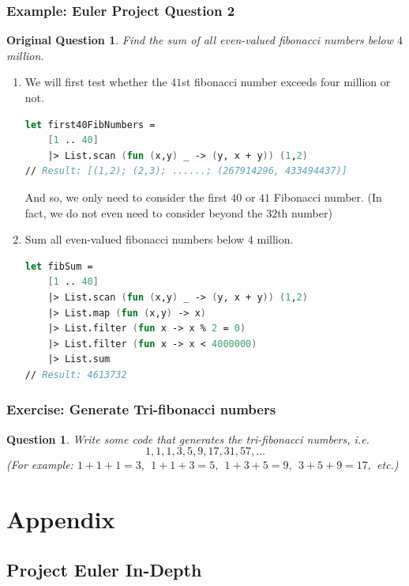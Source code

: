 \documentclass[12pt]{article}
\newtheorem*{question*}{Question}
\newtheorem*{origQuestion*}{Original Question}
\begin{document}
\subsubsection*{Example: Euler Project Question 2}
\begin{origQuestion*}
Find the sum of all even-valued fibonacci numbers below $4$ million.
\end{origQuestion*}
\begin{enumerate}
\item We will first test whether the $41$st fibonacci number exceeds four million or not.
\begin{lstlisting}[language=FSharp]
let first40FibNumbers =
    [1 .. 40]
    |> List.scan (fun (x,y) _ -> (y, x + y)) (1,2)
// Result: [(1,2); (2,3); ......; (267914296, 433494437)]
\end{lstlisting}
And so, we only need to consider the first $40$ or $41$ Fibonacci number. (In fact, we do not even need to consider beyond the $32$th number)
\item Sum all even-valued fibonacci numbers below $4$ million.
\begin{lstlisting}[language=FSharp]
let fibSum =
    [1 .. 40]
    |> List.scan (fun (x,y) _ -> (y, x + y)) (1,2)
    |> List.map (fun (x,y) -> x)
    |> List.filter (fun x -> x % 2 = 0)
    |> List.filter (fun x -> x < 4000000)
    |> List.sum
// Result: 4613732
\end{lstlisting}
\end{enumerate}

\subsubsection*{Exercise: Generate Tri-fibonacci numbers}
\begin{question*}
Write some code that generates the tri-fibonacci numbers, i.e.
\[
1, 1, 1, 3, 5, 9, 17, 31, 57, \ldots
\]
(For example: $1 + 1 + 1 = 3, \:\:1 + 1 + 3 = 5, \:\: 1 + 3 + 5 = 9,  \:\:3 + 5 + 9 = 17,$ etc.)
\end{question*}
\pagebreak

\appendix
\section{Appendix}


\subsection{Project Euler In-Depth}
\end{document}
